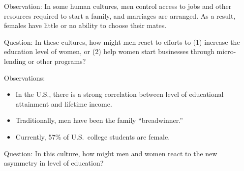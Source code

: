\begin{frame}[t]
    \begin{adjustwidth}{-2em}{-1.5em}
        Observation: In some human cultures, men control access to jobs and
        other resources required to start a family, and marriages are arranged.
        As a result, females have little or no ability to choose their mates. 

        \vspace{5mm}
        Question: In these cultures, how might men react to efforts to (1)
        increase the education level of women, or (2) help women start
        businesses through micro-lending or other programs? 


    \end{adjustwidth}
\end{frame}

\begin{frame}[t]
    \begin{adjustwidth}{-2em}{-1.5em}
        Observations:

        \begin{itemize}
            \item In the U.S., there is a strong correlation between
                level of educational attainment and lifetime income.
            
            \item Traditionally, men have been the family ``breadwinner.''

            \item Currently, 57\% of U.S.\ college students are female.
        \end{itemize}

        Question: In this culture, how might men and women react to the new
        asymmetry in level of education?


    \end{adjustwidth}
\end{frame}

